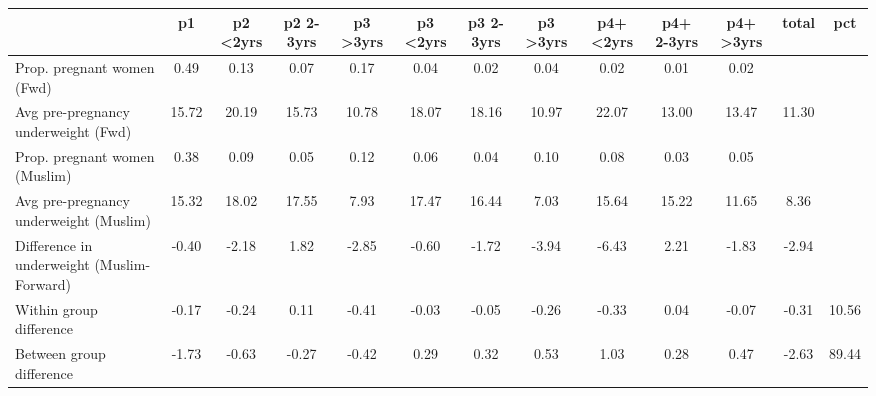 \begin{tabular}{l*{12}{c}}
\toprule
            &\multicolumn{1}{c}{p1}&\multicolumn{1}{c}{p2 <2yrs}&\multicolumn{1}{c}{p2 2-3yrs}&\multicolumn{1}{c}{p3 >3yrs}&\multicolumn{1}{c}{p3 <2yrs}&\multicolumn{1}{c}{p3 2-3yrs}&\multicolumn{1}{c}{p3 >3yrs}&\multicolumn{1}{c}{p4+ <2yrs}&\multicolumn{1}{c}{p4+ 2-3yrs}&\multicolumn{1}{c}{p4+ >3yrs}&\multicolumn{1}{c}{total}&\multicolumn{1}{c}{pct}\\
\midrule
\midrule
Prop. pregnant women (Fwd)&        0.49&        0.13&        0.07&        0.17&        0.04&        0.02&        0.04&        0.02&        0.01&        0.02&            &            \\
Avg pre-pregnancy underweight (Fwd)&       15.72&       20.19&       15.73&       10.78&       18.07&       18.16&       10.97&       22.07&       13.00&       13.47&       11.30&            \\
Prop. pregnant women (Muslim)&        0.38&        0.09&        0.05&        0.12&        0.06&        0.04&        0.10&        0.08&        0.03&        0.05&            &            \\
Avg pre-pregnancy underweight (Muslim)&       15.32&       18.02&       17.55&        7.93&       17.47&       16.44&        7.03&       15.64&       15.22&       11.65&        8.36&            \\
Difference in underweight (Muslim-Forward)&       -0.40&       -2.18&        1.82&       -2.85&       -0.60&       -1.72&       -3.94&       -6.43&        2.21&       -1.83&       -2.94&            \\
Within group difference&       -0.17&       -0.24&        0.11&       -0.41&       -0.03&       -0.05&       -0.26&       -0.33&        0.04&       -0.07&       -0.31&       10.56\\
Between group difference&       -1.73&       -0.63&       -0.27&       -0.42&        0.29&        0.32&        0.53&        1.03&        0.28&        0.47&       -2.63&       89.44\\
\bottomrule
\end{tabular}

